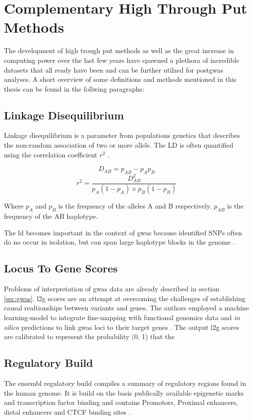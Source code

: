 \section{Complementary High Through Put Methods}
\label{sec:bioinformatics}
The development of high trough put methods as well as the great increase in computing power over the last few years have spawned a plethora of incredible datasets that all ready have been and can be further utilzed for post\ac{gwas} analyses. A short overview of some definitions and methods mentioned in this thesis can be found in the follwing paragraphs:

    \subsection{Linkage Disequilibrium}
    Linkage disequilibrium is a parameter from populations genetics that describes the non-random association of two or more allels. The LD is often quantified using the correlation coefficient $r^2$ \cite{slatkinLinkageDisequilibriumUnderstanding2008}.

    $$ D_{AB} = p_{AB} − p_A p_B $$
    $$ r^2 = \frac{D_{AB}^2}{p_A (1-p_A) \times p_B (1-p_B)} $$

    Where $p_A$ and $p_B$ is the frequency of the alleles A and B respectively. $p_{AB}$ is the frequency of the AB haplotype.

    The \ac{ld} becomes important in the context of \ac{gwas} because identified SNPs often do no occur in isolation, but can span large haplotype blocks in the genome \cite{slatkinLinkageDisequilibriumUnderstanding2008}.

    \subsection{Locus To Gene Scores}
    Problems of interpretation of \ac{gwas} data are already described in section \ref{sec:gwas}. \ac{l2g} scores are an attempt at overcoming the challenges of establishing causal realtionships between variants and genes. The authors employed a machine learning-model to integrate fine-mapping with functional genomics data and \textit{in silico} predictions to link \ac{gwas} loci to their target genes \cite{mountjoyOpenApproachSystematically2021}. The output \ac{l2g} scores are calibrated to represent the probability (0, 1) that the

    \subsection{Regulatory Build}
    The ensembl regulatory build compiles a summary of regulatory regions found in the human genome. It is build on the basis publically available epigenetic marks and transcription factor binding and contains Promotors, Proximal enhancers, distal enhancers and CTCF binding sites \cite{zerbinoEnsemblRegulatoryBuild2015}.

